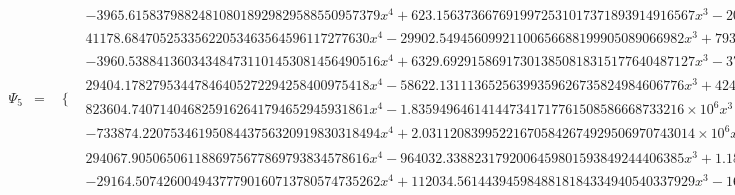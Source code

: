 \documentclass{article}
\begin{document}
\begin{landscape}
\begin{eqnarray*}
\begin{array}{cc}
\end{array}\\
\Psi_5 & = & \begin{array}{cc}
 \{ & 
\begin{array}{cc}
 -3965.615837988248108018929829588550957379 x^4+623.1563736676919972531017371893914916567 x^3-20.87635344539017856106607328900484138447 x^2 & x\geq 0\land x<\frac{1}{8} \\
 41178.68470525335622053463564596117277630 x^4-29902.54945609921100656688199905089066982 x^3+7931.029331893674540455320008683459947060 x^2-909.7738085585176352668595131345851874615 x+38.07216118534045579628653952466855543895 & x\geq \frac{1}{8}\land x<\frac{1}{4} \\
 -3960.538841360343484731101453081456490516 x^4+6329.692915869173013850818315177640487127 x^3-3710.491720542797748486536019875398503310 x^2+938.6427445790027369548582609171587749727 x-86.24060640480635504560918407002431077521 & x\geq \frac{1}{4}\land x<\frac{3}{8} \\
 29404.17827953447846405272294258400975418 x^4-58622.13111365256399359626735824984606776 x^3+42465.15951238561457485601494567033877211 x^2-13329.41493535157521035690365322560757724 x+1536.223600087092288651323841657607226430 & x\geq \frac{3}{8}\land x<\frac{1}{2} \\
 823604.7407140468259162641794652945931861 x^4-1.835949646141447341717761508586668733216\times 10^6 x^3+1.530372362823031194603718796186877748665\times 10^6 x^2-565341.2631924072456722014822344741438251 x+78093.75112727085801211535694286297230615 & x\geq \frac{1}{2}\land x<\frac{5}{8} \\
 -733874.2207534619508443756320919830318494 x^4+2.031120839952216705842674929506970743014\times 10^6 x^3-2.104717565794894502000296768353294299716\times 10^6 x^2+967773.4699971013591532438385236610861435 x-166602.5297206129251596990165304993011051 & x\geq \frac{5}{8}\land x<\frac{3}{4} \\
 294067.9050650611886975677869793834578616 x^4-964032.3388231792006459801593849244406385 x^3+1.183744707000831207153075772836431281515\times 10^6 x^2-645251.2873317644103542390304387851146774 x+131738.9438770437515013494114578334372862 & x\geq \frac{3}{4}\land x<\frac{7}{8} \\
 -29164.50742600494377790160713780574735262 x^4+112034.5614439459848818184334940540337929 x^3-161273.1933744359922247577719416420193209 x^2+103100.7321210538049156666719523449266736 x-24697.59276455885379482572636695119379295 & x\geq \frac{7}{8}\land x<1
\end{array}


\end{array}
\end{eqnarray*}
\end{landscape}
\end{document}
